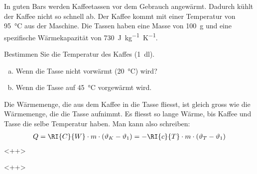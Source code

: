 
\begin{aufgabe}
In guten Bars werden Kaffeetassen vor dem Gebrauch angewärmt. Dadurch kühlt der Kaffee nicht so schnell ab.
Der Kaffee kommt mit einer Temperatur von \SI{95}{\celsius} aus der Maschine.
Die Tassen haben eine Masse von \SI{100}{g} und eine spezifische Wärmekapazität von \SI{730}{J kg^{-1} K^{-1}}.

Bestimmen Sie die Temperatur des Kaffes (\SI{1}{dl}).
\begin{enumerate} [a)]
	\item Wenn die Tasse nicht vorwärmt (\SI{20}{\celsius}) wird?
	\item Wenn die Tasse auf \SI{45}{\celsius} vorgewärmt wird.
\end{enumerate}

\begin{loesung}
	Die Wärmemenge, die aus dem Kaffee in die Tasse fliesst, ist gleich gross wie die Wärmemenge, die die Tasse aufnimmt.
	Es fliesst so lange Wärme, bis Kaffee und Tasse die selbe Temperatur haben.
	Man kann also schreiben:
	\begin{eqnarray*}
		Q=\RI{C}{W}\cdot m\cdot(\vartheta_K - \vartheta_1) = -\RI{c}{T}\cdot m\cdot (\vartheta_T - \vartheta_1)
	\end{eqnarray*}<++>
\end{loesung}<++>

\end{aufgabe}

